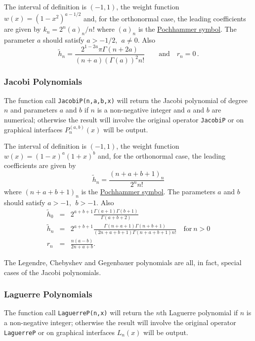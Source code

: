 The interval of definition is $(-1, 1)$, the weight function
$w(x)=(1-x^2)^{a-1/2}$ and, for the orthonormal case, the leading
coefficients are given by $k_n= 2^n (a)_n/n!$ where $(a)_n$ is the
\hyperlink{POCH}{Pochhammer symbol}.
The parameter $a$ should satisfy $a >-1/2,\ \ a \neq 0$. Also
\[\tilde{h}_n = \frac{2^{1-2 a}\pi \Gamma(n+2a)}{(n+a)(\Gamma(a))^2n!}\qquad
\mbox{and}\quad r_n=0\,.\]

\subsubsection{Jacobi Polynomials}
\hypertarget{JACOBIP}{}
 
The function call \texttt{JacobiP(n,a,b,x)} will return the Jacobi
polynomial of degree $n$ and parameters $a$ and $b$ if $n$ is a non-negative
integer  and $a$ and $b$ are numerical; otherwise the result will involve
the original operator \texttt{JacobiP} or on graphical interfaces
$P_n^{(a, b)}(x)$ will be output.

The interval of definition is $(-1, 1)$, the weight function
$w(x)=(1-x)^a(1+x)^b$ and, for the orthonormal case, the leading
coefficients are given by
\[\tilde{h}_n = \frac{(n+a+b+1)_n}{2^nn!}\]
where $(n+a+b+1)_n$ is the \hyperlink{POCH}{Pochhammer symbol}.
The parameters $a$ and $b$ should satisfy $a >-1,\ \ b > -1$. Also
\begin{eqnarray*}
\tilde{h}_0 & = & 2^{a+b+1}\frac{\Gamma(a+1)\Gamma(b+1)}{\Gamma(a+b+2)}\\
\tilde{h}_n & = & 2^{a+b+1}\frac{\Gamma(n+a+1)\Gamma(n+b+1)}{(2 n +a+b+1)
\Gamma(n+a+b+1)n!}\quad \mbox{for}\ n>0\\
r_n & = & \frac{n(a-b)}{2n+a+b}.
\end{eqnarray*}

The Legendre, Chebyshev and Gegenbauer polynomials are all, in fact, special
cases of the Jacobi polynomials.

\subsubsection{Laguerre Polynomials}
\hypertarget{LAGUERREP}{}
The function call \texttt{LaguerreP(n,x)} will return the $n$th Laguerre
polynomial if $n$ is a non-negative integer; otherwise the result will involve
the original operator \texttt{LaguerreP} or on graphical interfaces $L_n(x)$
will be output.

